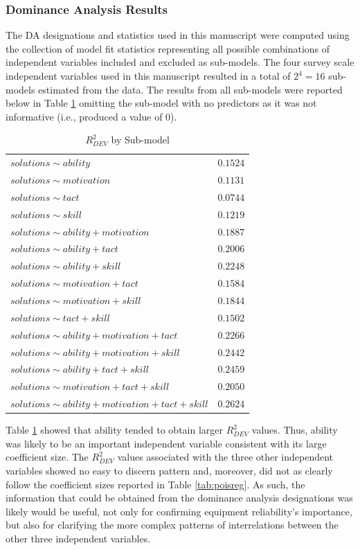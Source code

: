 \documentclass[man]{apa7}
\begin{document}
		\subsubsection{Dominance Analysis Results}
	
	The DA designations and statistics used in this manuscript were computed using the collection of model fit statistics representing all possible combinations of independent variables included and excluded as sub-models.
	The four survey scale independent variables used in this manuscript resulted in a total of $2^4 = 16$ sub-models estimated from the data.
	The results from all sub-models were reported below in Table \ref{tab:r2sub} omitting the sub-model with no predictors as it was not informative (i.e., produced a value of 0).
	
	\begin{table}[h!]
		\centering
		\caption{\centering $R^2_{DEV}$ by Sub-model}
		\begin{tabular}{l|r}
			\hline 
			$solutions \sim ability$ & $0.1524$ \\ 
			$solutions \sim motivation$ & $0.1131$ \\ 
			$solutions \sim tact$ & $0.0744$ \\ 
			$solutions \sim skill$ & $0.1219$ \\ 
			$solutions \sim ability + motivation$ & $0.1887$ \\ 
			$solutions \sim ability + tact$ & $0.2006$ \\ 
			$solutions \sim ability + skill$ & $0.2248$ \\ 
			$solutions \sim motivation + tact$ & $0.1584$ \\ 
			$solutions \sim motivation + skill$ & $0.1844$ \\ 
			$solutions \sim tact + skill$ & $0.1502$ \\ 
			$solutions \sim ability + motivation + tact$ & $0.2266$\\ 
			$solutions \sim ability + motivation + skill$ & $0.2442$ \\ 
			$solutions \sim ability + tact + skill$ & $0.2459$ \\ 
			$solutions \sim motivation + tact + skill$ & $0.2050$ \\ 
			$solutions \sim ability + motivation + tact + skill$ & $0.2624$ \\ 
			\hline 
		\end{tabular}
		\label{tab:r2sub}
	\end{table} 

	Table \ref{tab:r2sub} showed that ability tended to obtain larger $R^2_{DEV}$ values.
	Thus, ability was likely to be an important independent variable consistent with its large coefficient size. 
	The $R^2_{DEV}$ values associated with the three other independent variables showed no easy to discern pattern and, moreover, did not as clearly follow the coefficient sizes reported in Table \ref{tab:poisreg}.
	As such, the information that could be obtained from the dominance analysis designations was likely would be useful, not only for confirming equipment reliability's importance, but also for clarifying the more complex patterns of interrelations between the other three independent variables.
	
\end{document}
